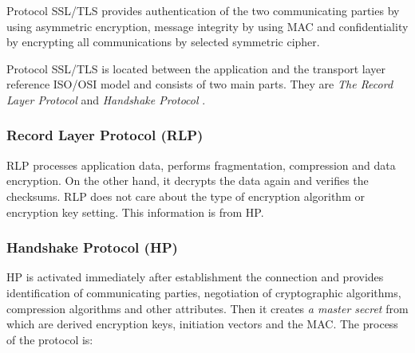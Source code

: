 \documentclass[
  digital, %
  notable,   %
  lof,     %
  lot,     %
]{fithesis3}
\begin{document}
Protocol SSL/TLS provides authentication of the two communicating parties by using asymmetric 
encryption, message integrity by using MAC and confidentiality by encrypting all 
communications by selected symmetric cipher.

Protocol SSL/TLS is located between the application and the transport layer reference ISO/OSI 
model and consists of two main parts. They are \textit{The Record Layer Protocol} and 
\textit{Handshake Protocol} \cite{oppliger2003security}. %

\subsubsection{Record Layer Protocol (RLP)}

RLP processes application data, performs fragmentation, compression and data encryption. On the 
other hand, it decrypts the data again and verifies the checksums. RLP does not care about the 
type of encryption algorithm or encryption key setting. This information is from HP.

\subsubsection{Handshake Protocol (HP)}
HP is activated immediately after establishment the connection and provides identification of 
communicating parties, negotiation of cryptographic algorithms, compression algorithms and other 
attributes. Then it creates \textit{a master secret} from which are derived encryption keys, 
initiation vectors and the MAC. The process of the protocol is:
\end{document}
